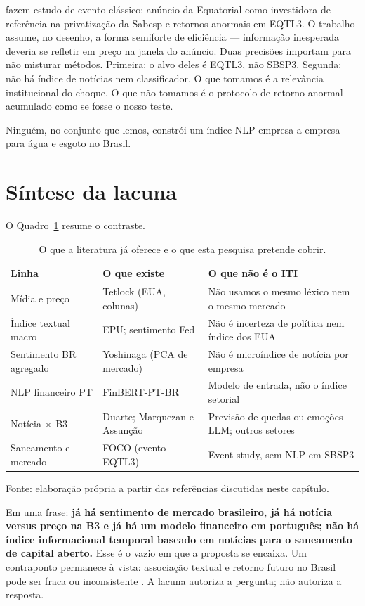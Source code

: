  fazem estudo de evento clássico: anúncio da Equatorial como investidora de referência na privatização da Sabesp e retornos anormais em EQTL3. O trabalho assume, no desenho, a forma semiforte de eficiência --- informação inesperada deveria se refletir em preço na janela do anúncio. Duas precisões importam para não misturar métodos. Primeira: o alvo deles é EQTL3, não SBSP3. Segunda: não há índice de notícias nem classificador. O que tomamos é a relevância institucional do choque. O que não tomamos é o protocolo de retorno anormal acumulado como se fosse o nosso teste.

Ninguém, no conjunto que lemos, constrói um índice NLP empresa a empresa para água e esgoto no Brasil.

\section{Síntese da lacuna}

O Quadro~\ref{tab:lacuna} resume o contraste.

\begin{table}[htbp]
\caption{O que a literatura já oferece e o que esta pesquisa pretende cobrir.}
\label{tab:lacuna}
\begin{tabular}{|p{}|p{}|p{}|}
\hline
\textbf{Linha} & \textbf{O que existe} & \textbf{O que não é o ITI} \\
\hline
Mídia e preço & Tetlock (EUA, colunas) & Não usamos o mesmo léxico nem o mesmo mercado \\
\hline
Índice textual macro & EPU; sentimento Fed & Não é incerteza de política nem índice dos EUA \\
\hline
Sentimento BR agregado & Yoshinaga (PCA de mercado) & Não é microíndice de notícia por empresa \\
\hline
NLP financeiro PT & FinBERT-PT-BR & Modelo de entrada, não o índice setorial \\
\hline
Notícia $\times$ B3 & Duarte; Marquezan e Assunção & Previsão de quedas ou emoções LLM; outros setores \\
\hline
Saneamento e mercado & FOCO (evento EQTL3) & Event study, sem NLP em SBSP3 \\
\hline
\end{tabular}
\end{table}

Fonte: elaboração própria a partir das referências discutidas neste capítulo.

Em uma frase: \textbf{já há sentimento de mercado brasileiro, já há notícia versus preço na B3 e já há um modelo financeiro em português; não há índice informacional temporal baseado em notícias para o saneamento de capital aberto.} Esse é o vazio em que a proposta se encaixa. Um contraponto permanece à vista: associação textual e retorno futuro no Brasil pode ser fraca ou inconsistente \cite{utfpr2024bert}. A lacuna autoriza a pergunta; não autoriza a resposta.
